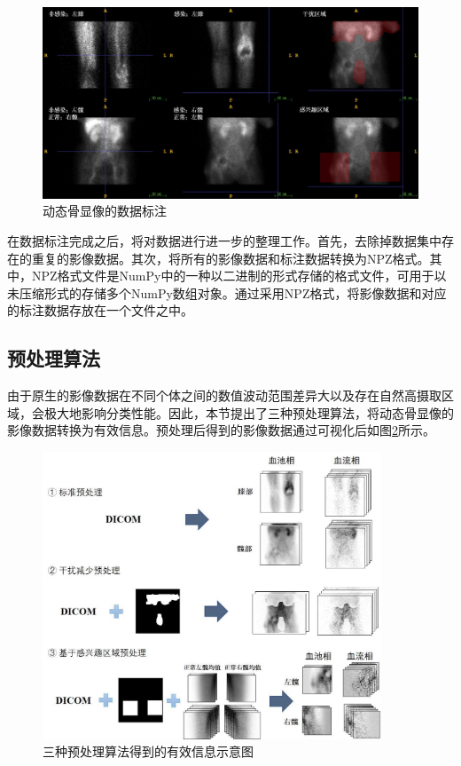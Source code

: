 \begin{figure}[htbp]
  \centering
  \includegraphics[width=\textwidth]{figures/chap03_label.jpg}
  \caption{动态骨显像的数据标注}
  \label{fig:chap03_label}
\end{figure}

在数据标注完成之后，将对数据进行进一步的整理工作。首先，去除掉数据集中存在的重复的影像数据。其次，将所有的影像数据和标注数据转换为NPZ格式。其中，NPZ格式文件是NumPy\cite{harris2020array}中的一种以二进制的形式存储的格式文件，可用于以未压缩形式的存储多个NumPy数组对象。通过采用NPZ格式，将影像数据和对应的标注数据存放在一个文件之中。

\subsection{预处理算法}

由于原生的影像数据在不同个体之间的数值波动范围差异大以及存在自然高摄取区域，会极大地影响分类性能。因此，本节提出了三种预处理算法，将动态骨显像的影像数据转换为有效信息。预处理后得到的影像数据通过可视化后如图\ref{fig:chap03_algorithm}所示。

\begin{figure}
  \centering
  \includegraphics[width=0.9\textwidth]{figures/chap03_algorithm.jpg}
  \caption{三种预处理算法得到的有效信息示意图}
  \label{fig:chap03_algorithm}
\end{figure}

